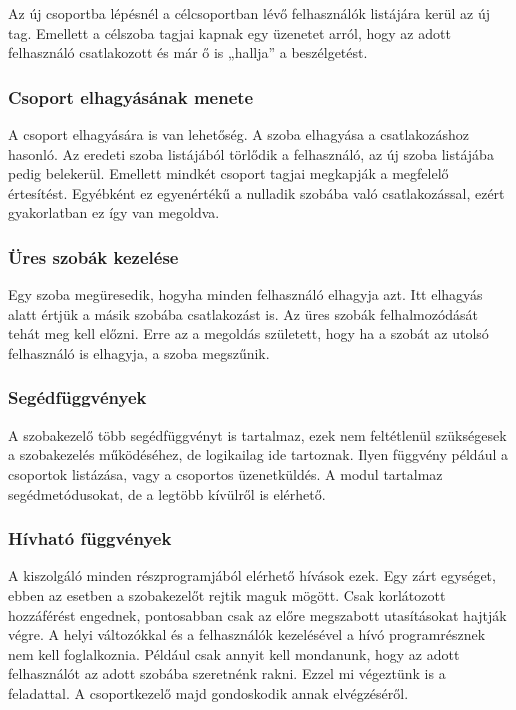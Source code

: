 \documentclass[bibliography=totocnumbered]{article}
\begin{document}
Az új csoportba lépésnél a célcsoportban lévő felhasználók listájára
kerül az új tag. Emellett a célszoba tagjai kapnak egy üzenetet arról,
hogy az adott felhasználó csatlakozott és már ő is „hallja'' a
beszélgetést.


\subsubsection{Csoport elhagyásának
menete}

A csoport elhagyására is van lehetőség. A szoba elhagyása a
csatlakozáshoz hasonló. Az eredeti szoba listájából törlődik a
felhasználó, az új szoba listájába pedig belekerül. Emellett mindkét
csoport tagjai megkapják a megfelelő értesítést. Egyébként ez
egyenértékű a nulladik szobába való csatlakozással, ezért gyakorlatban
ez így van megoldva.


\subsubsection{Üres szobák
kezelése}

Egy szoba megüresedik, hogyha minden felhasználó elhagyja azt. Itt
elhagyás alatt értjük a másik szobába csatlakozást is. Az üres szobák
felhalmozódását tehát meg kell előzni. Erre az a megoldás született,
hogy ha a szobát az utolsó felhasználó is elhagyja, a szoba megszűnik.


\subsubsection{Segédfüggvények}

A szobakezelő több segédfüggvényt is tartalmaz, ezek nem feltétlenül
szükségesek a szobakezelés működéséhez, de logikailag ide tartoznak.
Ilyen függvény például a csoportok listázása, vagy a csoportos
üzenetküldés. A modul tartalmaz segédmetódusokat, de a legtöbb kívülről
is elérhető.


\subsubsection{Hívható
függvények}

A kiszolgáló minden részprogramjából elérhető hívások ezek. Egy zárt
egységet, ebben az esetben a szobakezelőt rejtik maguk mögött. Csak
korlátozott hozzáférést engednek, pontosabban csak az előre megszabott
utasításokat hajtják végre. A helyi változókkal és a felhasználók
kezelésével a hívó programrésznek nem kell foglalkoznia. Például csak
annyit kell mondanunk, hogy az adott felhasználót az adott szobába
szeretnénk rakni. Ezzel mi végeztünk is a feladattal. A csoportkezelő
majd gondoskodik annak elvégzéséről.
\end{document}
